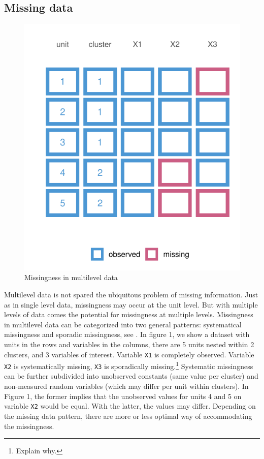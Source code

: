 \documentclass[
]{jss}
\begin{document}
\hypertarget{missing-data}{%
\subsection{Missing data}\label{missing-data}}

\begin{CodeChunk}
\begin{figure}

{\centering \includegraphics{Manuscript_files/figure-latex/patterns-1} 

}

\caption[Missingness in multilevel data]{Missingness in multilevel data}\label{fig:patterns}
\end{figure}
\end{CodeChunk}

Multilevel data is not spared the ubiquitous problem of missing
information. Just as in single level data, missingness may occur at the
unit level. But with multiple levels of data comes the potential for
missingness at multiple levels. Missingness in multilevel data can be
categorized into two general patterns: systematical missingness and
sporadic missingness, see \citet{resc13}. In figure 1, we show a dataset
with units in the rows and variables in the columns, there are 5 units
nested within 2 clusters, and 3 variables of interest. Variable
\texttt{X1} is completely observed. Variable \texttt{X2} is
systematically missing, \texttt{X3} is sporadically missing.\footnote{Explain
  why.} Systematic missingness can be further subdivided into unobserved
constants (same value per cluster) and non-measured random variables
(which may differ per unit within clusters). In Figure 1, the former
implies that the unobserved values for units 4 and 5 on variable
\texttt{X2} would be equal. With the latter, the values may differ.
Depending on the missing data pattern, there are more or less optimal
way of accommodating the missingness.
\end{document}
